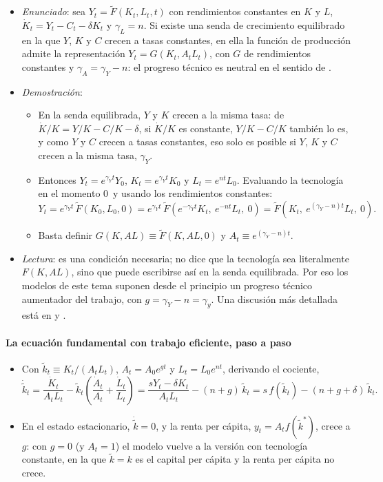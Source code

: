 \documentclass[11pt]{article}
\begin{document}
\begin{itemize}
\item \emph{Enunciado}\nocite{Uzawa1961}: sea $Y_t=\tilde F(K_t,L_t,t)$ con rendimientos constantes en $K$ y $L$, $\dot K_t=Y_t-C_t-\delta K_t$ y $\gamma_L=n$. Si existe una senda de crecimiento equilibrado en la que $Y$, $K$ y $C$ crecen a tasas constantes, en ella la función de producción admite la representación $Y_t=G(K_t,A_tL_t)$, con $G$ de rendimientos constantes y $\gamma_A=\gamma_Y-n$: el progreso técnico es neutral en el sentido de .
\item \emph{Demostración}\nocite{JonesScrimgeour2008New}:
  \begin{itemize}
  \item En la senda equilibrada, $Y$ y $K$ crecen a la misma tasa: de $\dot K/K=Y/K-C/K-\delta$, si $\dot K/K$ es constante, $Y/K-C/K$ también lo es, y como $Y$ y $C$ crecen a tasas constantes, eso solo es posible si $Y$, $K$ y $C$ crecen a la misma tasa, $\gamma_Y$.
  \item Entonces $Y_t=e^{\gamma_Yt}Y_0$, $K_t=e^{\gamma_Yt}K_0$ y $L_t=e^{nt}L_0$. Evaluando la tecnología en el momento 0~y usando los rendimientos constantes:
    \[Y_t=e^{\gamma_Yt}\,\tilde F(K_0,L_0,0)=e^{\gamma_Yt}\,\tilde F\!\left(e^{-\gamma_Yt}K_t,\ e^{-nt}L_t,\ 0\right)=\tilde F\!\left(K_t,\ e^{(\gamma_Y-n)t}L_t,\ 0\right).\]
  \item Basta definir $G(K,AL)\equiv\tilde F(K,AL,0)$ y $A_t\equiv e^{(\gamma_Y-n)t}$. \findemo
  \end{itemize}
\item \emph{Lectura}: es una condición necesaria; no dice que la tecnología sea literalmente $F(K,AL)$, sino que puede escribirse así en la senda equilibrada. Por eso los modelos de este tema suponen desde el principio un progreso técnico aumentador del trabajo, con $g=\gamma_Y-n=\gamma_y$. Una discusión más detallada está en \textcite[pp.~59-62]{Acemoglu2009} y \textcite[cap.~1]{SalaiMartin2000}.
\end{itemize}

\paragraph{La ecuación fundamental con trabajo eficiente, paso a paso}

\begin{itemize}
\item Con $\tilde k_t\equiv K_t/(A_tL_t)$, $A_t=A_0e^{gt}$ y $L_t=L_0e^{nt}$, derivando el cociente,
  \[\dot{\tilde k}_t=\frac{\dot K_t}{A_tL_t}-\tilde k_t\left(\frac{\dot A_t}{A_t}+\frac{\dot L_t}{L_t}\right)=\frac{sY_t-\delta K_t}{A_tL_t}-(n+g)\,\tilde k_t=s\,f(\tilde k_t)-(n+g+\delta)\,\tilde k_t.\]
\item En el estado estacionario, $\dot{\tilde k}=0$, y la renta per cápita, $y_t=A_tf(\tilde k^*)$, crece a $g$: con $g=0$ (y $A_t=1$) el modelo vuelve a la versión con tecnología constante, en la que $\tilde k=k$ es el capital per cápita y la renta per cápita no crece.
\end{itemize}
\end{document}
